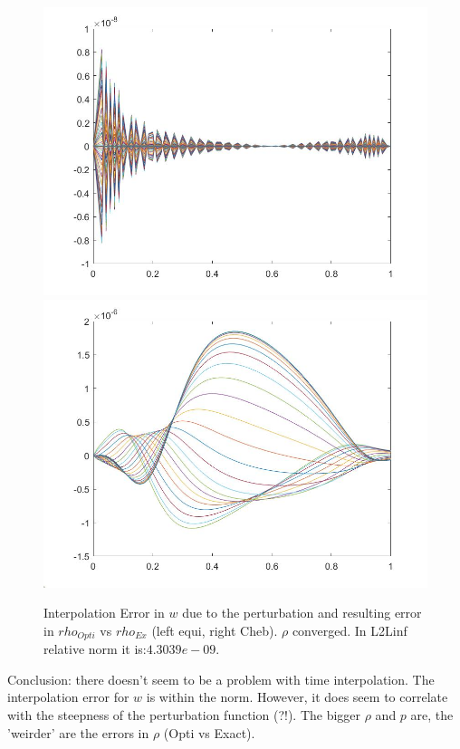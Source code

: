 \documentclass[11pt, a4paper]{article}
\theoremstyle{definition}
\begin{document}
		\begin{figure}[h]
		\includegraphics[scale=0.25]{ErrPert05a.jpg}
		\includegraphics[scale=0.25]{ErrrhoPert05a.jpg}
		\caption{Interpolation Error in $w$ due to the perturbation and resulting error in $rho_{Opti}$ vs $rho_{Ex}$ (left equi, right Cheb). $\rho$ converged. In L2Linf relative norm it is:$4.3039e-09$. }
		\label{Pert4}
	\end{figure}
Conclusion: there doesn't seem to be a problem with time interpolation. The interpolation error for $w$ is within the norm. However, it does seem to correlate with the steepness of the perturbation function (?!).
The bigger $\rho$ and $p$ are, the 'weirder' are the errors in $\rho$ (Opti vs Exact).
\end{document}
